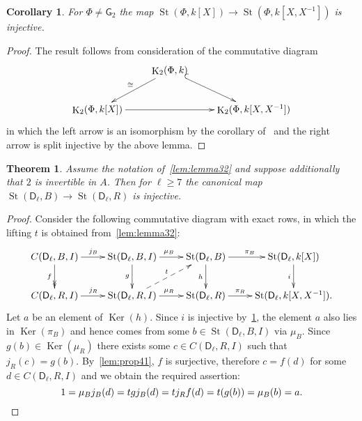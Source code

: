 \documentclass[oneside, 8pt]{amsart}
\newtheorem{theorem}{Theorem}
\newtheorem{corollary}{Corollary}
\theoremstyle{remark}
\theoremstyle{definition}
\DeclareMathOperator{\Ker}{Ker}
\DeclareMathOperator{\St}{St}
\DeclareMathOperator{\K}{K}
\newcommand{\rD}{\mathsf{D}}
\newcommand{\rG}{\mathsf{G}}
\numberwithin{equation}{section}
\begin{document}
\begin{corollary} \label{field-injectivity} For $\Phi\neq\rG_2$ the map $\St(\Phi, k[X]) \to \St(\Phi, k[X, X^{-1}])$ is injective. \end{corollary}
\begin{proof} The result follows from consideration of the commutative diagram
\[\xymatrix{ & \K_2(\Phi, k) \ar[dl]_{\cong} \ar@{^{(}->}[dr] & \\
               \K_2(\Phi, k[X]) \ar[rr] &               & \K_2(\Phi, k[X, X^{-1}])} \]
in which the left arrow is an isomorphism by the corollary of~\cite[Satz~1]{Re75} and the right arrow is split injective by the above lemma. \end{proof}
\begin{theorem} \label{thm41}
Assume the notation of~\cref{lem:lemma32} and suppose additionally that $2$ is invertible in $A$.
Then for $\ell \geq 7$ the canonical map $\St(\rD_\ell, B) \to \St(\rD_\ell, R)$ is injective.
\end{theorem}
\begin{proof}
 Consider the following commutative diagram with exact rows, in which the lifting $t$ is obtained from~\cref{lem:lemma32}:
\begin{equation*} \xymatrix{
 C(\rD_\ell, B, I) \ar[r]^{j_B} \ar@{->>}[d]_{f} & \St(\rD_\ell, B, I) \ar[r]^{\mu_B} \ar[d]_{g} &
 \St(\rD_\ell, B) \ar[r]^{\pi_B} \ar[d]_{h} & \St(\rD_\ell, k[X]) \ar[d]_{i} \\
 C(\rD_\ell, R, I) \ar[r]^{j_R}         & \St(\rD_\ell, R, I) \ar[r]^{\mu_R} \ar@{-->}[ur]^{t}&
 \St(\rD_\ell, R) \ar[r]^-{\pi_R}        & \St(\rD_\ell, k[X, X^{-1}]).
}\end{equation*}
Let $a$ be an element of $\Ker(h)$. Since $i$ is injective by~\cref{field-injectivity}, the element $a$
 also lies in $\Ker(\pi_B)$ and hence comes from some $b \in \St(\rD_\ell, B, I)$ via $\mu_B$.
Since $g(b) \in \Ker(\mu_R)$ there exists some $c \in C(\rD_\ell, R, I)$ such that $j_R(c) = g(b)$. 
By~\cref{lem:prop41}, $f$ is surjective, therefore $c = f(d)$ for some $d \in C(\rD_\ell, R, I)$ and we obtain the required assertion:
 \[ 1 = \mu_Bj_B(d) = tgj_B(d) = tj_Rf(d) =t(g(b)) = \mu_B(b) = a. \qedhere \]

\end{proof}
\end{document}
